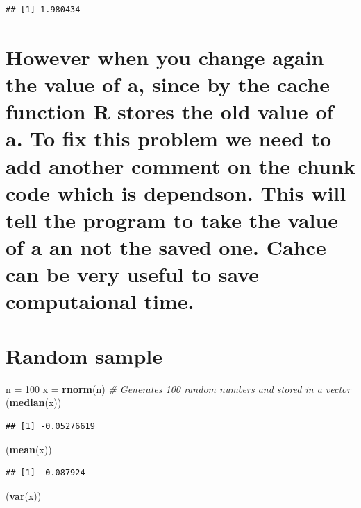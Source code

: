 \documentclass[]{article}
\newenvironment{Shaded}{\begin{snugshade}}{\end{snugshade}}
\newcommand{\KeywordTok}[1]{\textcolor[rgb]{0.13,0.29,0.53}{\textbf{#1}}}
\newcommand{\DecValTok}[1]{\textcolor[rgb]{0.00,0.00,0.81}{#1}}
\newcommand{\StringTok}[1]{\textcolor[rgb]{0.31,0.60,0.02}{#1}}
\newcommand{\CommentTok}[1]{\textcolor[rgb]{0.56,0.35,0.01}{\textit{#1}}}
\newcommand{\NormalTok}[1]{#1}
\begin{document}
\begin{verbatim}
## [1] 1.980434
\end{verbatim}

\section{However when you change again the value of a, since by the
cache function R stores the old value of a. To fix this problem we need
to add another comment on the chunk code which is dependson. This will
tell the program to take the value of a an not the saved one. Cahce can
be very useful to save computaional
time.}\label{however-when-you-change-again-the-value-of-a-since-by-the-cache-function-r-stores-the-old-value-of-a.-to-fix-this-problem-we-need-to-add-another-comment-on-the-chunk-code-which-is-dependson.-this-will-tell-the-program-to-take-the-value-of-a-an-not-the-saved-one.-cahce-can-be-very-useful-to-save-computaional-time.}

\section{Random sample}\label{random-sample}

\begin{Shaded}
\begin{Highlighting}[]
\NormalTok{n =}\StringTok{ }\DecValTok{100}
\NormalTok{x =}\StringTok{ }\KeywordTok{rnorm}\NormalTok{(n) }\CommentTok{# Generates 100 random numbers and stored in a vector}
\NormalTok{(}\KeywordTok{median}\NormalTok{(x))}
\end{Highlighting}
\end{Shaded}

\begin{verbatim}
## [1] -0.05276619
\end{verbatim}

\begin{Shaded}
\begin{Highlighting}[]
\NormalTok{(}\KeywordTok{mean}\NormalTok{(x))}
\end{Highlighting}
\end{Shaded}

\begin{verbatim}
## [1] -0.087924
\end{verbatim}

\begin{Shaded}
\begin{Highlighting}[]
\NormalTok{(}\KeywordTok{var}\NormalTok{(x))}
\end{Highlighting}
\end{Shaded}
\end{document}
